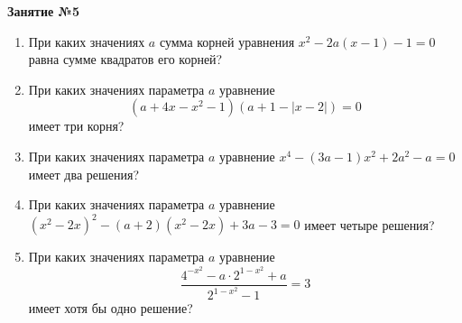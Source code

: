 \documentclass[12pt, a4paper]{article}
\begin{document}
	
   \cfoot{}
\begin{center}
	\Large
	\textbf{Занятие №5}
\end{center}
\begin{enumerate}[label=\textbf{\arabic*.}]
	\item При каких значениях \( a \) сумма корней уравнения \( x^2-2a(x-1)-1=0 \) равна сумме квадратов его корней?
	\item При каких значениях параметра \( a \) уравнение \[ (a+4x-x^2-1)(a+1-|x-2|)=0 \] имеет три корня?
	\item При каких значениях параметра \( a \) уравнение \( x^4-(3a-1)x^2+2a^2-a=0 \) имеет два решения?
	\item При каких значениях параметра \( a \) уравнение \( (x^2-2x)^2-(a+2)(x^2-2x)+3a-3=0 \) имеет четыре решения?
	\item При каких значениях параметра \( a \) уравнение \[ \dfrac{4^{-x^2}-a\cdot2^{1-x^2}+a}{2^{1-x^2}-1}=3 \] имеет хотя бы одно решение?
\end{enumerate}
\end{document}

